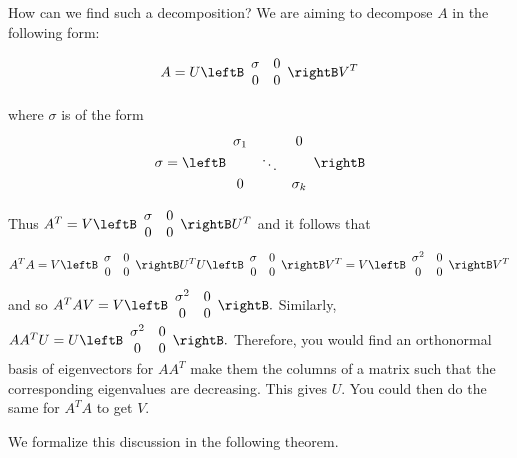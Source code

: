 How can we find such a decomposition? We are aiming to decompose $A$ in the following form:

\begin{equation*}
A=U\leftB 
\begin{array}{cc}
\sigma & 0 \\ 
0 & 0
\end{array}
\rightB V^T 
\end{equation*}

where $\sigma $ is of the form 
\[
\sigma =\leftB 
\begin{array}{ccc}
\sigma _{1} &  & 0 \\ 
& \ddots &  \\ 
0 &  & \sigma _{k}
\end{array}
\rightB
\]

Thus $A^T=V\leftB 
\begin{array}{cc}
\sigma & 0 \\ 
0 & 0
\end{array}
\rightB U^T$ and it follows that 
\begin{equation*}
A^TA=V\leftB 
\begin{array}{cc}
\sigma & 0 \\ 
0 & 0
\end{array}
\rightB U^TU\leftB 
\begin{array}{cc}
\sigma & 0 \\ 
0 & 0
\end{array}
\rightB V^T=V\leftB 
\begin{array}{cc}
\sigma ^{2} & 0 \\ 
0 & 0
\end{array}
\rightB V^T
\end{equation*}
and so $A^TAV=V\leftB 
\begin{array}{cc}
\sigma ^{2} & 0 \\ 
0 & 0
\end{array}
\rightB .$ Similarly, $AA^TU=U\leftB 
\begin{array}{cc}
\sigma ^{2} & 0 \\ 
0 & 0
\end{array}
\rightB .$ Therefore, you would find an orthonormal basis of eigenvectors
for $AA^T$ make them the columns of a matrix such that the
corresponding eigenvalues are decreasing. This gives $U.$ You could then do
the same for $A^TA$ to get $V$.

We formalize this discussion in the following theorem. 

